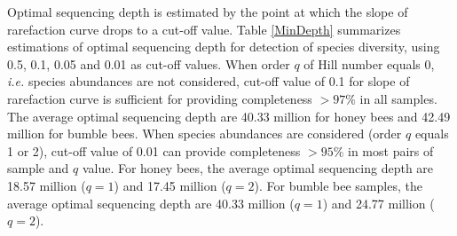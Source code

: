 \documentclass[11pt]{article}
\begin{document}
    Optimal sequencing depth is estimated by the point at which the slope of rarefaction curve drops to a cut-off value. 
    Table \ref{MinDepth} summarizes estimations of optimal sequencing depth for detection of species diversity, using 0.5, 0.1, 0.05 and 0.01 as cut-off values.  
    When order $q$ of Hill number equals 0, \textit{i.e.} species abundances are not considered, cut-off value of 0.1 for slope of rarefaction curve is sufficient for providing completeness $> 97\%$ in all samples. 
    The average optimal sequencing depth are 40.33 million for honey bees and 42.49 million for bumble bees. 
    When species abundances are considered (order $q$ equals 1 or 2), cut-off value of 0.01 can provide completeness $> 95\%$ in most pairs of sample and $q$ value. 
    For honey bees, the average optimal sequencing depth are 18.57 million ($q = 1$) and 17.45 million ($q = 2$). 
    For bumble bee samples, the average optimal sequencing depth are 40.33 million ($q = 1$) and 24.77 million ($q = 2$). 
\end{document}
